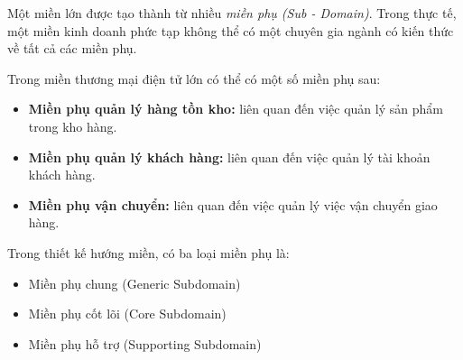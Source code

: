 Một miền lớn được tạo thành từ nhiều \emph{miền phụ (Sub - Domain)}. Trong thực tế, một miền kinh doanh phức tạp không thể có một chuyên gia ngành có kiến thức về tất cả các miền phụ.

\begin{example} Trong miền thương mại điện tử lớn có thể có một số miền phụ sau:

\begin{itemize}

\item \textbf{Miền phụ quản lý hàng tồn kho:} liên quan đến việc quản lý sản phẩm trong kho hàng.

\item \textbf{Miền phụ quản lý khách hàng:} liên quan đến việc quản lý tài khoản khách hàng.

\item \textbf{Miền phụ vận chuyển:} liên quan đến việc quản lý việc vận chuyển giao hàng.

\end{itemize}

\end{example}


Trong thiết kế hướng miền, có ba loại miền phụ là:

\begin{itemize}

\item Miền phụ chung (Generic Subdomain)

\item Miền phụ cốt lõi (Core Subdomain)

\item Miền phụ hỗ trợ (Supporting Subdomain)

\end{itemize}